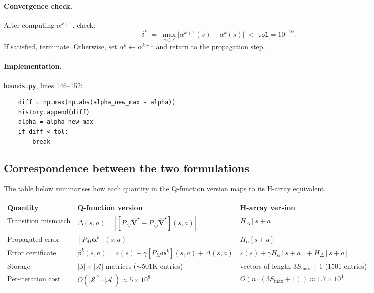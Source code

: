\documentclass[11pt]{article}
\newcommand{\Smax}{S_{\max}}
\begin{document}
\paragraph{Convergence check.}

After computing $\alpha^{k+1}$, check:
\begin{equation}\label{eq:convergence}
  \delta^k \;=\; \max_{s \in \mathcal{S}} \bigl|\alpha^{k+1}(s) - \alpha^k(s)\bigr|
  \;<\; \texttt{tol} = 10^{-10}.
\end{equation}
If satisfied, terminate.  Otherwise, set $\alpha^k \leftarrow \alpha^{k+1}$ and
return to the propagation step.

\paragraph{Implementation.}
\texttt{bounds.py}, lines 146--152:
\begin{verbatim}
    diff = np.max(np.abs(alpha_new_max - alpha))
    history.append(diff)
    alpha = alpha_new_max
    if diff < tol:
        break
\end{verbatim}

\subsection{Correspondence between the two formulations}

The table below summarises how each quantity in the Q-function version maps to
its H-array equivalent.

\begin{center}
\renewcommand{\arraystretch}{1.3}
\begin{tabular}{lll}
\toprule
\textbf{Quantity} & \textbf{Q-function version} & \textbf{H-array version} \\
\midrule
Transition mismatch
  & $\Delta(s,a) = |[P_M \hat{\mathbf{V}}^\star - P_{\hat M}\hat{\mathbf{V}}^\star](s,a)|$
  & $H_\Delta[s+a]$ \\
Propagated error
  & $[P_M \boldsymbol{\alpha}^k](s,a)$
  & $H_\alpha[s+a]$ \\
Error certificate
  & $\beta^k(s,a) = \varepsilon(s) + \gamma [P_M\boldsymbol{\alpha}^k](s,a) + \Delta(s,a)$
  & $\varepsilon(s) + \gamma H_\alpha[s+a] + H_\Delta[s+a]$ \\
Storage
  & $|\mathcal{S}| \times |\mathcal{A}|$ matrices ($\sim\!501$K entries)
  & vectors of length $3\Smax+1$ (1501 entries) \\
Per-iteration cost
  & $O(|\mathcal{S}|^2 \cdot |\mathcal{A}|) \approx 5 \times 10^8$
  & $O(n \cdot (3\Smax + 1)) \approx 1.7 \times 10^4$ \\
\bottomrule
\end{tabular}
\end{center}
\end{document}
